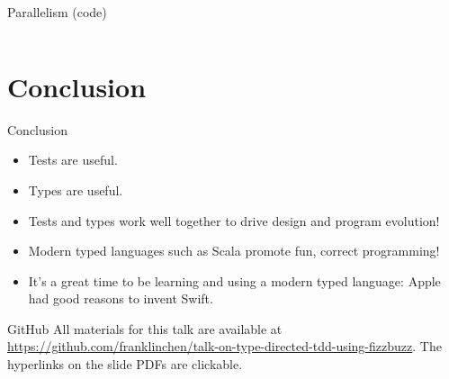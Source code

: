 \begin{frame}[fragile]{Parallelism (code)}
  \inputminted[gobble=2]{scala}{FizzBuzz9.scala}
\end{frame}

\section{Conclusion}

\begin{frame}{Conclusion}
  \begin{itemize}
  \item \alert{Tests} are useful.
  \item \alert{Types} are useful.
  \item Tests and types work well together to drive design and program evolution!
  \item Modern typed languages such as Scala promote fun, correct programming!
  \item It's a great time to be learning and using a modern typed language: Apple had good reasons to invent Swift.
  \end{itemize}

  \begin{block}{GitHub}
    All materials for this talk are available at \url{https://github.com/franklinchen/talk-on-type-directed-tdd-using-fizzbuzz}. The hyperlinks on the slide PDFs are clickable.
  \end{block}
\end{frame}





